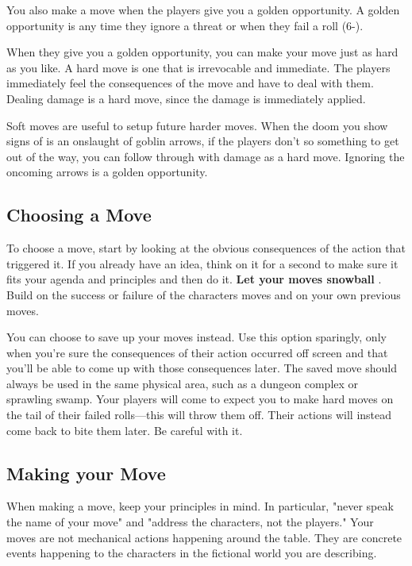  

You also make a move when the players give you a golden opportunity. A golden opportunity is any time they ignore a threat or when they fail a roll (6-).

 

When they give you a golden opportunity, you can make your move just as hard as you like. A hard move is one that is irrevocable and immediate. The players immediately feel the consequences of the move and have to deal with them. Dealing damage is a hard move, since the damage is immediately applied.

 

Soft moves are useful to setup future harder moves. When the doom you show signs of is an onslaught of goblin arrows, if the players don't so something to get out of the way, you can follow through with damage as a hard move. Ignoring the oncoming arrows is a golden opportunity.

 
\subsection{Choosing a Move}   
 

To choose a move, start by looking at the obvious consequences of the action that triggered it. If you already have an idea, think on it for a second to make sure it fits your agenda and principles and then do it. {\bf Let your moves snowball} . Build on the success or failure of the characters moves and on your own previous moves.

 

You can choose to save up your moves instead. Use this option sparingly, only when you're sure the consequences of their action occurred off screen and that you'll be able to come up with those consequences later. The saved move should always be used in the same physical area, such as a dungeon complex or sprawling swamp. Your players will come to expect you to make hard moves on the tail of their failed rolls—this will throw them off. Their actions will instead come back to bite them later. Be careful with it.

 
\subsection{Making your Move}   
 

When making a move, keep your principles in mind. In particular, "never speak the name of your move" and "address the characters, not the players." Your moves are not mechanical actions happening around the table. They are concrete events happening to the characters in the fictional world you are describing.


